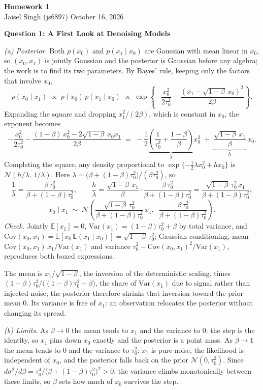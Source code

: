 \documentclass[12pt]{article}
\newcommand{\Norm}{\mathcal{N}}
\newcommand{\sbeta}{\sqrt{1-\beta}}
\newcommand{\den}{\beta + (1-\beta)\tau_0^2}
\newcommand{\E}{\mathbb{E}}
\newcommand{\Var}{\mathrm{Var}}
\newcommand{\Cov}{\mathrm{Cov}}
\begin{document}
\begin{flushleft}
\textbf{Homework 1} \\
Jaisel Singh (js6897) \hfill October 16, 2026
\end{flushleft}

\textbf{Question 1: A First Look at Denoising Models}

\textit{(a) Posterior.} Both $p(x_0)$ and $p(x_1 \mid x_0)$ are Gaussian with mean
linear in $x_0$, so $(x_0, x_1)$ is jointly Gaussian and the posterior is Gaussian
before any algebra; the work is to find its two parameters. By Bayes' rule, keeping
only the factors that involve $x_0$,
\[
  p(x_0 \mid x_1) \;\propto\; p(x_0)\, p(x_1 \mid x_0)
  \;\propto\; \exp\left\{ -\frac{x_0^2}{2\tau_0^2}
  - \frac{(x_1 - \sbeta\, x_0)^2}{2\beta} \right\}.
\]
Expanding the square and dropping $x_1^2 / (2\beta)$, which is constant in $x_0$,
the exponent becomes
\[
  -\frac{x_0^2}{2\tau_0^2}
  - \frac{(1-\beta)\,x_0^2 - 2\sbeta\, x_0 x_1}{2\beta}
  \;=\; -\frac{1}{2}
  \underbrace{\left( \frac{1}{\tau_0^2} + \frac{1-\beta}{\beta} \right)}_{\textstyle \lambda}
  x_0^2
  \;+\; \underbrace{\frac{\sbeta\, x_1}{\beta}}_{\textstyle h}\, x_0 .
\]
Completing the square, any density proportional to
$\exp\{ -\tfrac12 \lambda x_0^2 + h x_0 \}$ is $\Norm(h/\lambda,\, 1/\lambda)$.
Here $\lambda = \big(\den\big) / (\beta \tau_0^2)$, so
\[
  \frac{1}{\lambda} = \frac{\beta\,\tau_0^2}{\den},
  \qquad
  \frac{h}{\lambda} = \frac{\sbeta\, x_1}{\beta} \cdot \frac{\beta\,\tau_0^2}{\den}
  = \frac{\sbeta\,\tau_0^2\, x_1}{\den},
\]
\[
  \boxed{\;
  x_0 \mid x_1 \;\sim\; \Norm\!\left(
  \frac{\sbeta\,\tau_0^2}{\den}\, x_1,\;\;
  \frac{\beta\,\tau_0^2}{\den}
  \right). \;}
\]
\textit{Check.} Jointly $\E[x_1] = 0$, $\Var(x_1) = (1-\beta)\tau_0^2 + \beta$ by total
variance, and $\Cov(x_0, x_1) = \E[x_0 \,\E(x_1 \mid x_0)] = \sbeta\,\tau_0^2$; Gaussian
conditioning, mean $\Cov(x_0,x_1)\,x_1 / \Var(x_1)$ and variance
$\tau_0^2 - \Cov(x_0,x_1)^2 / \Var(x_1)$, reproduces both boxed expressions.

The mean is $x_1 / \sbeta$, the inversion of the deterministic scaling, times
$(1-\beta)\tau_0^2 / \big((1-\beta)\tau_0^2 + \beta\big)$, the share of $\Var(x_1)$ due
to signal rather than injected noise; the posterior therefore shrinks that inversion
toward the prior mean $0$. Its variance is free of $x_1$: an observation relocates the
posterior without changing its spread.

\textit{(b) Limits.} As $\beta \to 0$ the mean tends to $x_1$ and the variance to $0$: the
step is the identity, so $x_1$ pins down $x_0$ exactly and the posterior is a point mass.
As $\beta \to 1$ the mean tends to $0$ and the variance to $\tau_0^2$: $x_1$ is pure noise,
the likelihood is independent of $x_0$, and the posterior falls back on the prior $\Norm(0, \tau_0^2)$.
Since $d\sigma^2/d\beta = \tau_0^4 / \big(\den\big)^2 > 0$, the variance climbs
monotonically between these limits, so $\beta$ sets how much of $x_0$ survives the step.
\end{document}
